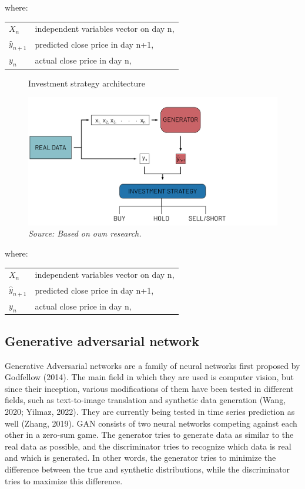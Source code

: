\documentclass[review]{elsarticle} %
\makeatletter
\newenvironment{conditions}
{\par\vspace{\abovedisplayskip}\noindent\begin{tabular}{>{$}l<{$} @{${}={}$} l}}
       {\end{tabular}\par\vspace{\belowdisplayskip}}
\makeatother
\begin{document}
\noindent where:
\begin{conditions}
X_n & independent variables vector on day n, \\ 
 \hat{y}_{n+1}     &   predicted close price in day n+1,\\
 y_{n}     &  actual close price  in day n,\\   
\end{conditions}

\begin{figure}[H]
\caption{Investment strategy architecture}
\includegraphics{rysunek2.png}
\caption*{\textit{Source: Based on own research.}}
\end{figure}
\noindent where:
\begin{conditions}
X_n & independent variables vector on day n, \\ 
 \hat{y}_{n+1}     &   predicted close price in day n+1,\\
 y_{n}     &  actual close price  in day n,\\   
\end{conditions}

\subsection{Generative adversarial network}

Generative Adversarial networks are a family of neural networks first proposed by Godfellow (2014). The main field in which they are used is computer vision, but since their inception, various modifications of them have been tested in different fields, such as text-to-image translation and synthetic data generation (Wang, 2020; Yilmaz, 2022). They are currently being tested in time series prediction as well (Zhang, 2019).  GAN consists of two neural networks competing against each other in a zero-sum game. The generator tries to generate data as similar to the real data as possible, and the discriminator tries to recognize which data is real and which is generated. In other words, the generator tries to minimize the difference between the true and synthetic distributions, while the discriminator tries to maximize this difference. 
\end{document}
